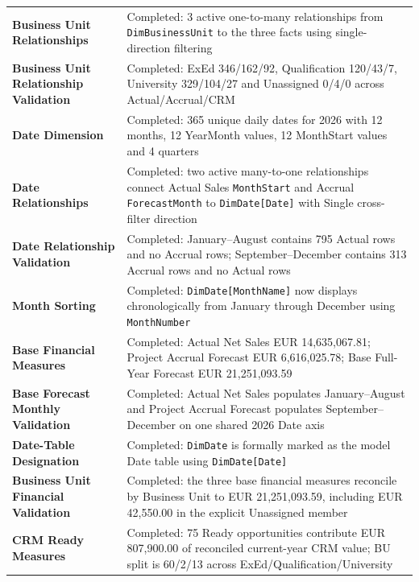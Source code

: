 \documentclass[11pt,a4paper]{article}
\begin{document}
\begin{summarybox}
\begin{tabularx}{\textwidth}{
    >{\bfseries\color{AaltoNavy}}p{4.3cm}
    X
}
Business Unit Relationships
&
Completed: 3 active one-to-many relationships from \texttt{DimBusinessUnit}
to the three facts using single-direction filtering
\\

Business Unit Relationship Validation
&
Completed: ExEd 346/162/92, Qualification 120/43/7,
University 329/104/27 and Unassigned 0/4/0 across Actual/Accrual/CRM
\\

Date Dimension
&
Completed: 365 unique daily dates for 2026 with 12 months,
12 YearMonth values, 12 MonthStart values and 4 quarters
\\

Date Relationships
&
Completed: two active many-to-one relationships connect Actual Sales
\texttt{MonthStart} and Accrual \texttt{ForecastMonth} to \texttt{DimDate[Date]}
with Single cross-filter direction
\\

Date Relationship Validation
&
Completed: January--August contains 795 Actual rows and no Accrual rows;
September--December contains 313 Accrual rows and no Actual rows
\\

Month Sorting
&
Completed: \texttt{DimDate[MonthName]} now displays chronologically from
January through December using \texttt{MonthNumber}
\\

Base Financial Measures
&
Completed: Actual Net Sales EUR 14,635,067.81; Project Accrual Forecast
EUR 6,616,025.78; Base Full-Year Forecast EUR 21,251,093.59
\\

Base Forecast Monthly Validation
&
Completed: Actual Net Sales populates January--August and Project Accrual
Forecast populates September--December on one shared 2026 Date axis
\\

Date-Table Designation
&
Completed: \texttt{DimDate} is formally marked as the model Date table using
\texttt{DimDate[Date]}
\\

Business Unit Financial Validation
&
Completed: the three base financial measures reconcile by Business Unit to
EUR 21,251,093.59, including EUR 42,550.00 in the explicit Unassigned member
\\

CRM Ready Measures
&
Completed: 75 Ready opportunities contribute EUR 807,900.00 of reconciled
current-year CRM value; BU split is 60/2/13 across ExEd/Qualification/University
\\


\end{tabularx}
\end{summarybox}
\end{document}
